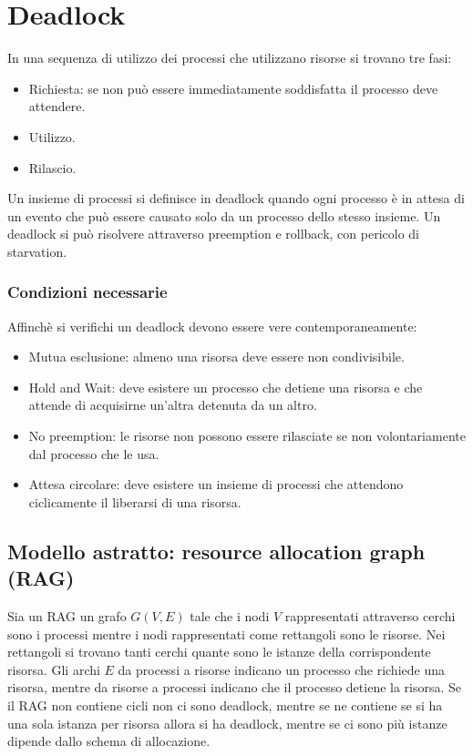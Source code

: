 \chapter{Deadlock}
In una sequenza di utilizzo dei processi che utilizzano risorse si trovano tre fasi:
\begin{itemize}
	\item Richiesta: se non pu\`o essere immediatamente soddisfatta il processo deve attendere.
	\item Utilizzo.
	\item Rilascio.
\end{itemize}
Un insieme di processi si definisce in deadlock quando ogni processo \`e in attesa di un evento che pu\`o essere causato solo da un processo dello stesso insieme. Un deadlock si pu\`o 
risolvere attraverso preemption e rollback, con pericolo di starvation. 
\subsection{Condizioni necessarie}
Affinch\`e si verifichi un deadlock devono essere vere contemporaneamente:
\begin{itemize}
	\item Mutua esclusione: almeno una risorsa deve essere non condivisibile.
	\item Hold and Wait: deve esistere un processo che detiene una risorsa e che attende di acquisirne un'altra detenuta da un altro. 
	\item No preemption: le risorse non possono essere rilasciate se non volontariamente dal processo che le usa.
	\item Attesa circolare: deve esistere un insieme di processi che attendono ciclicamente il liberarsi di una risorsa. 
\end{itemize}
\section{Modello astratto: resource allocation graph (RAG)}
Sia un RAG un grafo $G(V, E)$ tale che i nodi $V$ rappresentati attraverso cerchi sono i processi mentre i nodi rappresentati come rettangoli sono le risorse. Nei rettangoli si trovano
tanti cerchi quante sono le istanze della corrispondente risorsa. Gli archi $E$ da processi a risorse indicano un processo che richiede una risorsa, mentre da risorse a processi 
indicano che il processo detiene la risorsa. Se il RAG non contiene cicli non ci sono deadlock, mentre se ne contiene se si ha una sola istanza per risorsa allora si ha deadlock, 
mentre se ci sono pi\`u istanze dipende dallo schema di allocazione. 
